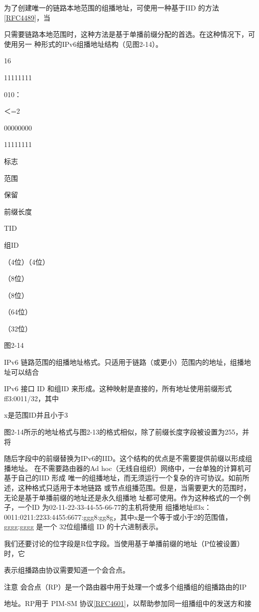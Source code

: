 为了创建唯一的链路本地范围的组播地址，可使用一种基于IID 的方法\href{https://www.rfc-editor.org/rfc/rfc4489}{[RFC4489]}，当

只需要链路本地范围时，这种方法是基于单播前缀分配的首选。在这种情况下，可使用另一
种形式的IPv6组播地址结构（见图2-14）。

16

11111111

010：

＜=2

00000000

11111111

标志

范围

保留

前缀长度

TID

组ID

（4位）（4位）

（8位）

（8位）

（64位）

（32位）

图2-14

IPv6 链路范围的组播地址格式。只适用于链路（或更小）范围内的地址，组播地址可以结合

IPv6 接口 ID 和组ID 来形成。这种映射是直接的，所有地址使用前缀形式ff3:0011/32，其中

x是范围ID并且小于3

图2-14所示的地址格式与图2-13的格式相似，除了前缀长度字段被设置为255，并将

随后字段中的前缀替换为IPv6的IID。这个结构的优点是不需要提供前缀以形成组播地址。
在不需要路由器的Ad hoc（无线自组织）网络中，一台单独的计算机可基于自己的IID 形成
唯一的组播地址，而无须运行一个复杂的许可协议。如前所述，这种格式只适用于本地链路
或节点组播范围。但是，当需要更大的范围时，无论是基于单播前缀的地址还是永久组播地
址都可使用。作为这种格式的一个例子，一个ID 为02-11-22-33-44-55-66-77的主机将使用
组播地址ff3x：0011:0211:2233:4455:6677:ggg8:gg8g，其中x是一个等于或小于2的范围值，
gggg:gggg 是一个 32位组播组 ID 的十六进制表示。

我们还要讨论的位字段是R位字段。当使用基于单播前缀的地址（P位被设置）时，它

表示组播路由协议需要知道一个会合点。

注意 会合点（RP）是一个路由器中用于处理一个或多个组播组的组播路由的IP

地址。RP用于 PIM-SM 协议\href{https://www.rfc-editor.org/rfc/rfc4601}{[RFC4601]}，以帮助参加同一组播组中的发送方和接

